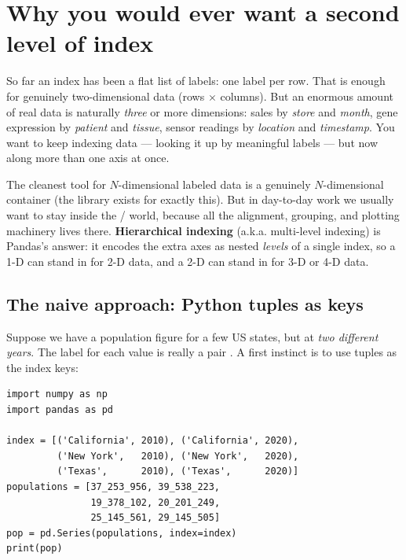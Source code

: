 \documentclass[11pt]{article}
\begin{document}

\section{Why you would ever want a second level of index}

So far an index has been a flat list of labels: one label per row. That is enough for genuinely two-dimensional data (rows $\times$ columns). But an enormous amount of real data is naturally \emph{three} or more dimensions: sales by \emph{store} and \emph{month}, gene expression by \emph{patient} and \emph{tissue}, sensor readings by \emph{location} and \emph{timestamp}. You want to keep indexing data --- looking it up by meaningful labels --- but now along more than one axis at once.

\begin{background}
The cleanest tool for $N$-dimensional labeled data is a genuinely $N$-dimensional container (the  library exists for exactly this). But in day-to-day work we usually want to stay inside the / world, because all the alignment, grouping, and plotting machinery lives there. \textbf{Hierarchical indexing} (a.k.a. multi-level indexing) is Pandas's answer: it encodes the extra axes as nested \emph{levels} of a single index, so a 1-D  can stand in for 2-D data, and a 2-D  can stand in for 3-D or 4-D data.
\end{background}

\subsection{The naive approach: Python tuples as keys}

Suppose we have a population figure for a few US states, but at \emph{two different years}. The label for each value is really a pair . A first instinct is to use tuples as the index keys:

\begin{lstlisting}
import numpy as np
import pandas as pd

index = [('California', 2010), ('California', 2020),
         ('New York',   2010), ('New York',   2020),
         ('Texas',      2010), ('Texas',      2020)]
populations = [37_253_956, 39_538_223,
               19_378_102, 20_201_249,
               25_145_561, 29_145_505]
pop = pd.Series(populations, index=index)
print(pop)
\end{lstlisting}
\end{document}
